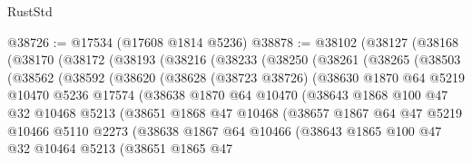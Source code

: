\begin{lexlean}{RustStd}
\begin{coremodule}
@38726 := @17534 (@17608 @1814 @5236)
@38878 := @38102
    (@38127
      (@38168
        (@38170
          (@38172
            (@38193
              (@38216
                (@38233
                  (@38250
                    (@38261
                      (@38265
                        (@38503
                          (@38562
                            (@38592
                              (@38620
                                (@38628
                                  (@38723 @38726)
                                  (@38630
                                    @1870
                                    @64
                                    @5219
                                    @10470
                                    @5236
                                    @17574
                                    (@38638
                                      @1870
                                      @64
                                      @10470
                                      (@38643
                                        @1868
                                        @100
                                        @47
                                        @32
                                        @10468
                                        @5213
                                        (@38651
                                          @1868
                                          @47
                                          @10468
                                          (@38657
                                            @1867
                                            @64
                                            @47
                                            @5219
                                            @10466
                                            @5110
                                            @2273
                                            (@38638
                                              @1867
                                              @64
                                              @10466
                                              (@38643
                                                @1865
                                                @100
                                                @47
                                                @32
                                                @10464
                                                @5213
                                                (@38651
                                                  @1865
                                                  @47

\end{coremodule}
\end{lexlean}
